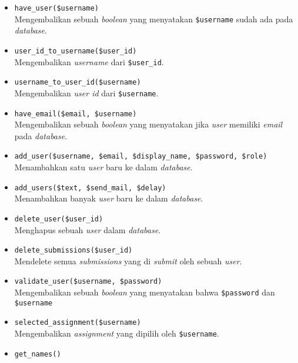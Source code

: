 \begin{itemize}
            \begin{itemize}
                  \item \verb|have_user($username)| \\
                        Mengembalikan sebuah \textit{boolean} yang menyatakan \verb|$username| sudah ada pada \textit{database}.
                  \item \verb|user_id_to_username($user_id)| \\
                        Mengembalikan \textit{username} dari \verb|$user_id|.
                  \item \verb|username_to_user_id($username)| \\
                        Mengembalikan \textit{user id} dari \verb|$username|.
                  \item \verb|have_email($email, $username)| \\
                        Mengembalikan sebuah \textit{boolean} yang menyatakan jika \textit{user} memiliki \textit{email} pada \textit{database}.
                  \item \verb|add_user($username, $email, $display_name, $password, $role)| \\
                        Menambahkan satu \textit{user} baru ke dalam \textit{database}.
                  \item \verb|add_users($text, $send_mail, $delay)| \\
                        Menambahkan banyak \textit{user} baru ke dalam \textit{database}.
                  \item \verb|delete_user($user_id)| \\
                        Menghapus sebuah \textit{user} dalam \textit{database}.
                  \item \verb|delete_submissions($user_id)| \\
                        Mendelete semua \textit{submissions} yang di \textit{submit} oleh sebuah \textit{user}.
                  \item \verb|validate_user($username, $password)| \\
                        Mengembalikan sebuah \textit{boolean} yang menyatakan bahwa \verb|$password| dan \verb|$username|
                  \item \verb|selected_assignment($username)| \\
                        Mengembalikan \textit{assignment} yang dipilih oleh \verb|$username|.
                  \item \verb|get_names()| \\

\end{itemize}
\end{itemize}
